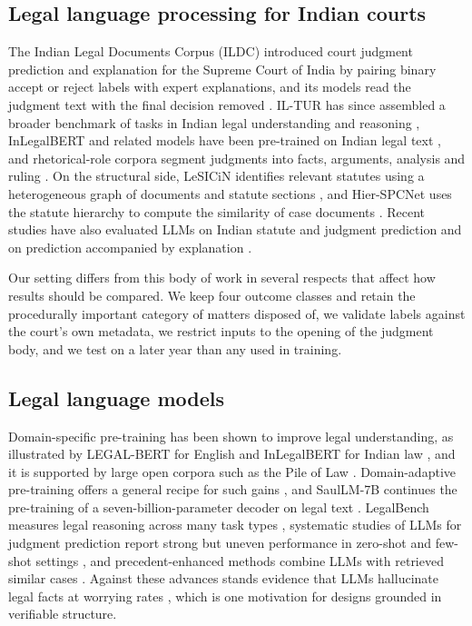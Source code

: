 \documentclass[11pt,a4paper]{article}
\begin{document}
\subsection{Legal language processing for Indian courts}
The Indian Legal Documents Corpus (ILDC) introduced court judgment prediction and explanation for the Supreme Court of India by pairing binary accept or reject labels with expert explanations, and its models read the judgment text with the final decision removed \cite{r10}. IL-TUR has since assembled a broader benchmark of tasks in Indian legal understanding and reasoning \cite{r11}, InLegalBERT and related models have been pre-trained on Indian legal text \cite{r12}, and rhetorical-role corpora segment judgments into facts, arguments, analysis and ruling \cite{r41}. On the structural side, LeSICiN identifies relevant statutes using a heterogeneous graph of documents and statute sections \cite{r16}, and Hier-SPCNet uses the statute hierarchy to compute the similarity of case documents \cite{r17}. Recent studies have also evaluated LLMs on Indian statute and judgment prediction \cite{r42} and on prediction accompanied by explanation \cite{r43}.

Our setting differs from this body of work in several respects that affect how results should be compared. We keep four outcome classes and retain the procedurally important category of matters disposed of, we validate labels against the court's own metadata, we restrict inputs to the opening of the judgment body, and we test on a later year than any used in training.

\subsection{Legal language models}
Domain-specific pre-training has been shown to improve legal understanding, as illustrated by LEGAL-BERT for English \cite{r44} and InLegalBERT for Indian law \cite{r12}, and it is supported by large open corpora such as the Pile of Law \cite{r45}. Domain-adaptive pre-training offers a general recipe for such gains \cite{r46}, and SaulLM-7B continues the pre-training of a seven-billion-parameter decoder on legal text \cite{r47}. LegalBench measures legal reasoning across many task types \cite{r48}, systematic studies of LLMs for judgment prediction report strong but uneven performance in zero-shot and few-shot settings \cite{r49}, and precedent-enhanced methods combine LLMs with retrieved similar cases \cite{r50}. Against these advances stands evidence that LLMs hallucinate legal facts at worrying rates \cite{r51}, which is one motivation for designs grounded in verifiable structure.
\end{document}
